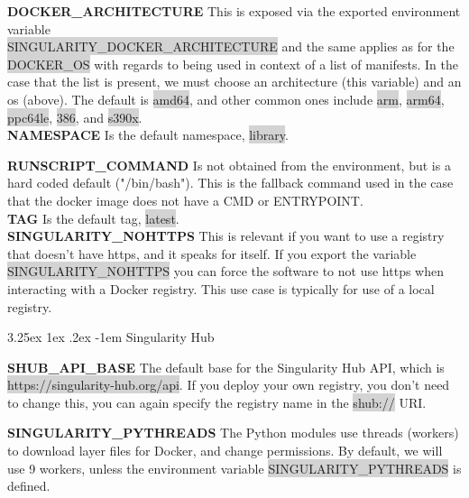 \documentclass[a4paper]{article}
\makeatletter
\newcounter{subsubsubsection}[subsubsection]
\renewcommand\paragraph{\@startsection{paragraph}{5}{\z@}%
  {3.25ex \@plus1ex \@minus.2ex}%
  {-1em}%
  {\normalfont\normalsize\bfseries}}
\makeatother
\begin{document}
\textbf{DOCKER\_ARCHITECTURE} This is exposed via the exported environment variable \\
\colorbox{lightgray}{SINGULARITY\_DOCKER\_ARCHITECTURE} and the same applies as for the \colorbox{lightgray}{DOCKER\_OS} with regards to being used in context of a list of manifests. In the case that the list is present, we must choose an architecture (this variable) and an os (above). The default is \colorbox{lightgray}{amd64}, and other common ones include \colorbox{lightgray}{arm}, \colorbox{lightgray}{arm64}, \colorbox{lightgray}{ppc64le}, \colorbox{lightgray}{386}, and \colorbox{lightgray}{s390x}.\\[0.1in]

\textbf{NAMESPACE} Is the default namespace, \colorbox{lightgray}{library}.

\textbf{RUNSCRIPT\_COMMAND} Is not obtained from the environment, but is a hard coded default ("/bin/bash"). This is the fallback command used in the case that the docker image does not have a CMD or ENTRYPOINT.\\[0.1in]

\textbf{TAG} Is the default tag, \colorbox{lightgray}{latest}.\\[0.1in]

\textbf{SINGULARITY\_NOHTTPS} This is relevant if you want to use a registry that doesn’t have https, and it speaks for itself. If you export the variable \colorbox{lightgray}{SINGULARITY\_NOHTTPS} you can force the software to not use https when interacting with a Docker registry. This use case is typically for use of a local registry.

\paragraph{Singularity Hub}

\textbf{SHUB\_API\_BASE} The default base for the Singularity Hub API, which is\\ \colorbox{lightgray}{https://singularity-hub.org/api}. If you deploy your own registry, you don’t need to change this, you can again specify the registry name in the \colorbox{lightgray}{shub://} URI.


\textbf{SINGULARITY\_PYTHREADS} The Python modules use threads (workers) to download layer files for Docker, and change permissions. By default, we will use 9 workers, unless the environment variable \colorbox{lightgray}{SINGULARITY\_PYTHREADS} is defined.\\[0.1in]
\end{document}
